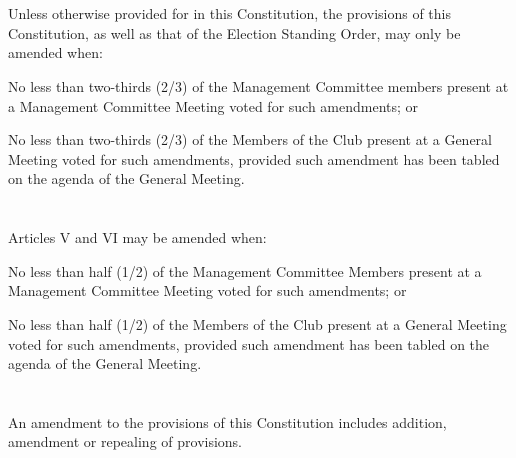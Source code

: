 
\section{}
Unless otherwise provided for in this Constitution, the provisions of this Constitution, as well as that of the Election Standing Order, may only be amended when:
	\begin{legal}
	\item No less than two-thirds (2/3) of the Management Committee members present at a Management Committee Meeting voted for such amendments; or
	\item No less than two-thirds (2/3) of the Members of the Club present at a General Meeting voted for such amendments, provided such amendment has been tabled on the agenda of the General Meeting.
	\end{legal}

\section{}
Articles V and VI may be amended when:
	\begin{legal}
	\item No less than half (1/2) of the Management Committee Members present at a Management Committee Meeting voted for such amendments; or
	\item No less than half (1/2) of the Members of the Club present at a General Meeting voted for such amendments, provided such amendment has been tabled on the agenda of the General Meeting.
	\end{legal}

\section{}
An amendment to the provisions of this Constitution includes addition, amendment or repealing of provisions.